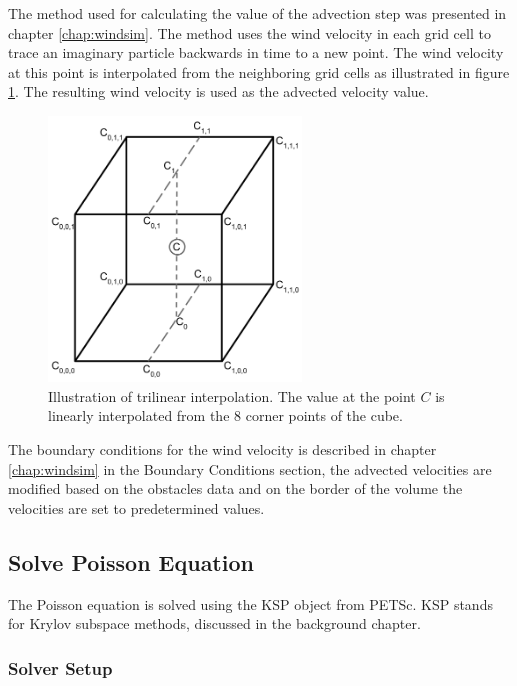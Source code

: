 The method used for calculating the value of the advection step was presented
in chapter \ref{chap:windsim}. The method uses the wind velocity in each grid cell
to trace an imaginary particle backwards in time to a new point. The wind velocity
at this point is interpolated from the neighboring grid cells as illustrated in
figure \ref{fig:trilinearinterpolation}. The resulting wind velocity is used as
the advected velocity value.

\begin{figure}[ht]
	\center
	\includegraphics[width=0.6\textwidth]{images/trilinear_interpolation}
	\caption{Illustration of trilinear interpolation. The value at the point
	$C$ is linearly interpolated from the 8 corner points of the cube.}
	\label{fig:trilinearinterpolation}
\end{figure}

The boundary conditions for the wind velocity is described in chapter \ref{chap:windsim}
in the Boundary Conditions section, the advected velocities are modified based on
the obstacles data and on the border of the volume the velocities are set to
predetermined values.

\subsection{Solve Poisson Equation}

The Poisson equation is solved using the KSP object from PETSc. KSP stands for
Krylov subspace methods, discussed in the background chapter.

\subsubsection{Solver Setup}

